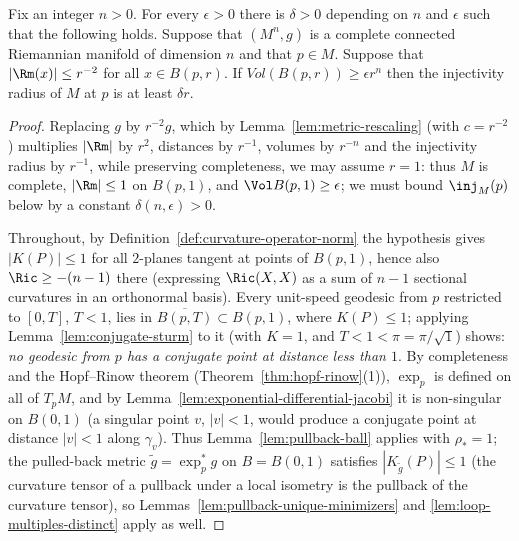 \begin{theorem}
\label{thm:volume-injectivity-radius}
\label{volinj}
Fix an integer $n>0$. For every $\epsilon>0$ there is $\delta>0$
depending on $n$ and $\epsilon$ such that the following holds.
Suppose that $(M^n,g)$ is a complete connected Riemannian
manifold of dimension $n$ and that $p\in M$. Suppose that $|\Rm(x)|\le
r^{-2}$ for all $x\in B(p,r)$. If $Vol(B(p,r))\ge \epsilon r^n$ then
the injectivity radius of $M$ at $p$ is at least $\delta r$.
\end{theorem}

\begin{proof}
Replacing $g$ by $r^{-2}g$, which by
Lemma~\ref{lem:metric-rescaling} (with $c=r^{-2}$) multiplies
$|\Rm|$ by $r^{2}$,
distances by $r^{-1}$, volumes by $r^{-n}$ and the injectivity
radius by $r^{-1}$, while preserving completeness, we may assume
$r=1$: thus $M$ is
complete, $|\Rm|\le1$ on $B(p,1)$, and $\Vol B(p,1)\ge\epsilon$; we
must bound $\inj_M(p)$ below by a constant $\delta(n,\epsilon)>0$.

Throughout, by Definition~\ref{def:curvature-operator-norm} the
hypothesis gives $|K(P)|\le1$ for all $2$-planes tangent at points
of $B(p,1)$, hence also $\Ric\ge-(n-1)$ there (expressing
$\Ric(X,X)$ as a sum of $n-1$ sectional curvatures in an
orthonormal basis). Every unit-speed geodesic from $p$
restricted to $[0,T]$, $T<1$, lies in
$\overline{B(p,T)}\subset B(p,1)$, where $K(P)\le1$; applying
Lemma~\ref{lem:conjugate-sturm} to it (with $K=1$, and
$T<1<\pi=\pi/\sqrt{1}$)
shows: \emph{no geodesic from $p$ has a conjugate point at
distance less than $1$}. By
completeness and the Hopf--Rinow theorem
(Theorem~\ref{thm:hopf-rinow}(1)), $\exp_p$ is defined
on all of $T_pM$, and by
Lemma~\ref{lem:exponential-differential-jacobi} it is
non-singular on $B(0,1)$ (a singular point $v$, $|v|<1$, would
produce a conjugate point at distance $|v|<1$ along
$\gamma_v$). Thus
Lemma~\ref{lem:pullback-ball} applies with $\rho_*=1$; the
pulled-back metric $\tilde g=\exp_p^*g$ on $B=B(0,1)$
satisfies $|K_{\tilde g}(P)|\le1$ (the curvature tensor of a
pullback under a local isometry is the pullback of the curvature
tensor), so Lemmas~\ref{lem:pullback-unique-minimizers} and
\ref{lem:loop-multiples-distinct} apply as well.


\end{proof}
